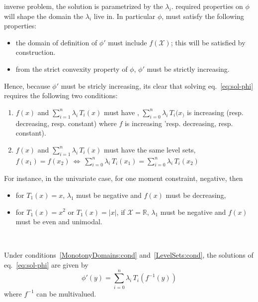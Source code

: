 \documentclass[english,sort&compress]{elsarticle}
\theoremstyle{definition}
\theoremstyle{plain}
\theoremstyle{plain}
\def\Rset{\mathbb{R}}
\def\X{\mathcal{X}}
\begin{document}
 inverse  problem, the solution is
parametrized by  the $\lambda_i$.  required properties  on $\phi$ will
shape the domain the $\lambda_i$ live in. In particular $\phi$, must satisfy the
following properties:
%
\begin{itemize}
\item the  domain of definition  of $\phi'$ must  include $f(\X)$; this  will be
  satisfied by construction.
%
\item from  the strict  convexity property of  $\phi$, $\phi'$ must  be strictly
  increasing.
\end{itemize}
%
Hence,  because $\phi'$  must  be  stricly increasing,  its  clear that  solving
eq.~\eqref{eq:sol-phi}  requires the following two conditions:
%
\begin{enumerate}[label=(C\arabic*)]
\item\label{MonotonyDomains:cond}   $f(x)$   and   $\displaystyle   \sum_{i=1}^n
  \lambda_i  \,  T_i(x)$  must  have  ,
  $\displaystyle    \sum_{i=0}^n   \lambda_i    \,   T_i(x_)$    is   increasing
  (resp. decreasing, resp. constant)  where $f$ is increasing 'resp. decreasing,
  resp. constant).
%
\item\label{LevelSets:cond} $f(x)$ and  $\displaystyle \sum_{i=1}^n \lambda_i \,
  T_i(x)$ must have the same level  sets, $f(x_1) = f(x_2) \: \Leftrightarrow \:
  \displaystyle \sum_{i=0}^n  \lambda_i \, T_i(x_1) =  \sum_{i=0}^n \lambda_i \,
  T_i(x_2)$
\end{enumerate}
%
For instance, in the univariate case, for one moment constraint, negative, then
%
\begin{itemize}
\item  for  $T_1(x) =  x$,  $\lambda_1$  must be  negative  and  $f(x)$ must  be
  decreasing,
%
\item for $T_1(x) = x^2$ or $T_1(x) = |x|$, if $\X = \Rset$, $\lambda_1$ must be
  negative and $f(x)$ must be even and unimodal.
\end{itemize}

\

Under  conditions~\ref{MonotonyDomains:cond} and~\ref{LevelSets:cond}, the
solutions of eq.~\eqref{eq:sol-phi} are given by
%
\begin{equation}\label{eq:derivative-phi}
\phi'(y) = \sum_{i=0}^n \lambda_i \, T_i\!\left(f^{-1}(y)\right)
\end{equation}
%
where $f^{-1}$ can be multivalued.
\end{document}
